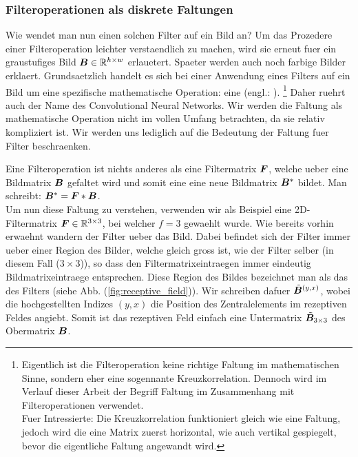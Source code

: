 \para{}
\cite{Markl}

\subsubsection{Filteroperationen als diskrete Faltungen}
Wie wendet man nun einen solchen Filter auf ein Bild an? Um das Prozedere einer
Filteroperation leichter verstaendlich zu machen, wird sie erneut fuer ein
graustufiges Bild $\bm{B} \in \mathbb{R}^{h \times w}$ erlauetert. Spaeter werden auch noch farbige
Bilder erklaert.
\para{}
Grundsaetzlich handelt es sich bei einer Anwendung eines Filters auf ein Bild um
eine spezifische mathematische Operation: eine  (engl.:
).
\footnote{
  Eigentlich ist die Filteroperation keine richtige Faltung im mathematischen
  Sinne, sondern eher eine sogennante Kreuzkorrelation. Dennoch wird im Verlauf
  dieser Arbeit der Begriff Faltung im Zusammenhang mit Filteroperationen verwendet.\\
  Fuer Intressierte: Die Kreuzkorrelation funktioniert gleich wie eine Faltung,
  jedoch wird die eine Matrix zuerst horizontal, wie auch vertikal gespiegelt,
  bevor die eigentliche Faltung angewandt wird.
}
Daher ruehrt auch der Name des Convolutional Neural Networks.
Wir werden die Faltung als mathematische Operation nicht im vollen Umfang
betrachten, da sie relativ kompliziert ist. Wir werden uns lediglich auf die
Bedeutung der Faltung fuer Filter beschraenken.
\para{}

Eine Filteroperation ist nichts anderes als eine Filtermatrix $\bm{F}$, welche ueber eine
Bildmatrix $\bm{B}$ gefaltet wird und somit eine eine neue Bildmatrix
$\bm{B}^*$ bildet. Man schreibt: $\bm{B}^* = \bm{F} * \bm{B}$.\\
Um nun diese Faltung zu verstehen, verwenden wir als Beispiel eine
2D-Filtermatrix $\bm{F} \in \mathbb{R}^{3 \times 3}$, bei welcher
$f = 3$ gewaehlt wurde.
Wie bereits vorhin erwaehnt wandern der Filter ueber das Bild. Dabei befindet
sich der Filter immer ueber einer Region des Bilder, welche gleich gross ist,
wie der Filter selber (in diesem Fall ($3 \times 3$)), so dass den Filtermatrixeintraegen immer eindeutig
Bildmatrixeintraege entsprechen. Diese Region des Bildes bezeichnet man als das
 des Filters (siehe Abb. (\ref{fig:receptive_field})). Wir schreiben dafuer
$\tilde{\bm{B}}^{(y,x)}$, wobei die hochgestellten Indizes $(y,x)$ die Position
des Zentralelements im rezeptiven Feldes angiebt. Somit ist das rezeptiven Feld einfach eine
Untermatrix $\tilde{\bm{B}}_{3 \times 3}$ des Obermatrix $\bm{B}$.

